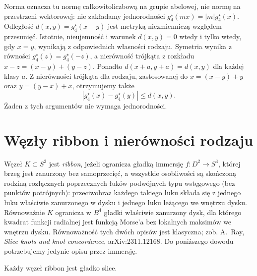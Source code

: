 \begin{uwaga}
Norma oznacza tu normę całkowitoliczbową
na grupie abelowej, nie normę na przestrzeni
wektorowej: nie zakładamy jednorodności
$g_4^\star(mx)=|m|g_4^\star(x)$.
Odległość $d(x,y)=g_4^\star(x-y)$ jest
metryką niezmienniczą względem przesunięć.
Istotnie, nieujemność i warunek $d(x,y)=0$
wtedy i tylko wtedy, gdy $x=y$, wynikają
z odpowiednich własności rodzaju. Symetria
wynika z równości $g_4^\star(z)=g_4^\star(-z)$,
a nierówność trójkąta z rozkładu
$x-z=(x-y)+(y-z)$. Ponadto
$d(x+a,y+a)=d(x,y)$ dla każdej klasy $a$.
Z nierówności trójkąta dla rodzaju, zastosowanej
do $x=(x-y)+y$ oraz $y=(y-x)+x$, otrzymujemy
także
\[
|g_4^\star(x)-g_4^\star(y)|\le d(x,y).
\]
Żaden z tych argumentów nie wymaga jednorodności.
\end{uwaga}

\section{Węzły ribbon i nierówności rodzaju}
\label{sec:kt-ribbon}

\begin{definicja}
Węzeł $K\subset S^3$ jest \emph{ribbon}, jeżeli ogranicza
gładką immersję $f:D^2\to S^3$, której brzeg
jest zanurzony bez samoprzecięć, a wszystkie osobliwości
są skończoną rodziną rozłącznych poprzecznych łuków
podwójnych typu wstęgowego (bez punktów potrójnych):
przeciwobraz każdego takiego łuku składa się z jednego
łuku właściwie zanurzonego w dysku i jednego łuku leżącego
we wnętrzu dysku. Równoważnie $K$ ogranicza w $B^4$
gładki właściwie zanurzony dysk, dla którego
kwadrat funkcji radialnej jest funkcją Morse'a
bez lokalnych maksimów we wnętrzu dysku.
Równoważność tych dwóch opisów jest klasyczna;
zob. A.~Ray, \emph{Slice knots and knot concordance},
arXiv:2311.12168. Do poniższego dowodu potrzebujemy
jedynie opisu przez immersję.
\end{definicja}

\begin{stwierdzenie}
Każdy węzeł ribbon jest gładko slice.
\end{stwierdzenie}

